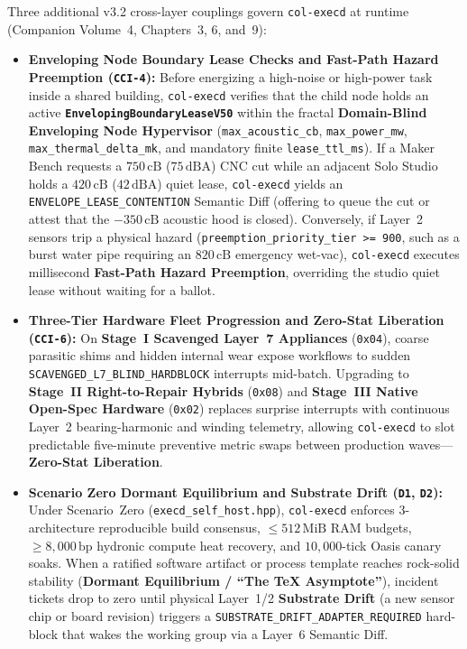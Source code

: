 Three additional v3.2 cross-layer couplings govern \texttt{col-execd} at runtime (Companion Volume~4, Chapters~3, 6, and~9):
\begin{itemize}
  \item \textbf{Enveloping Node Boundary Lease Checks and Fast-Path Hazard Preemption (\texttt{CCI-4}):} Before energizing a high-noise or high-power task inside a shared building, \texttt{col-execd} verifies that the child node holds an active \textbf{\texttt{EnvelopingBoundaryLeaseV50}} within the fractal \textbf{Domain-Blind Enveloping Node Hypervisor} (\texttt{max\_acoustic\_cb}, \texttt{max\_power\_mw}, \texttt{max\_thermal\_delta\_mk}, and mandatory finite \texttt{lease\_ttl\_ms}). If a Maker Bench requests a $750\,\mathrm{cB}$ ($75\,\mathrm{dBA}$) CNC cut while an adjacent Solo Studio holds a $420\,\mathrm{cB}$ ($42\,\mathrm{dBA}$) quiet lease, \texttt{col-execd} yields an \texttt{ENVELOPE\_LEASE\_CONTENTION} Semantic Diff (offering to queue the cut or attest that the $-350\,\mathrm{cB}$ acoustic hood is closed). Conversely, if Layer~2 sensors trip a physical hazard (\texttt{preemption\_priority\_tier >= 900}, such as a burst water pipe requiring an $820\,\mathrm{cB}$ emergency wet-vac), \texttt{col-execd} executes millisecond \textbf{Fast-Path Hazard Preemption}, overriding the studio quiet lease without waiting for a ballot.
  \item \textbf{Three-Tier Hardware Fleet Progression and Zero-Stat Liberation (\texttt{CCI-6}):} On \textbf{Stage~I Scavenged Layer~7 Appliances} (\texttt{0x04}), coarse parasitic shims and hidden internal wear expose workflows to sudden \texttt{SCAVENGED\_L7\_BLIND\_HARDBLOCK} interrupts mid-batch. Upgrading to \textbf{Stage~II Right-to-Repair Hybrids} (\texttt{0x08}) and \textbf{Stage~III Native Open-Spec Hardware} (\texttt{0x02}) replaces surprise interrupts with continuous Layer~2 bearing-harmonic and winding telemetry, allowing \texttt{col-execd} to slot predictable five-minute preventive metric swaps between production waves---\textbf{Zero-Stat Liberation}.
  \item \textbf{Scenario Zero Dormant Equilibrium and Substrate Drift (\texttt{D1}, \texttt{D2}):} Under Scenario~Zero (\texttt{execd\_self\_host.hpp}), \texttt{col-execd} enforces 3-architecture reproducible build consensus, $\le 512\,\mathrm{MiB}$ RAM budgets, $\ge 8{,}000\,\mathrm{bp}$ hydronic compute heat recovery, and $10{,}000$-tick Oasis canary soaks. When a ratified software artifact or process template reaches rock-solid stability (\textbf{Dormant Equilibrium / ``The \TeX{} Asymptote''}), incident tickets drop to zero until physical Layer~1/2 \textbf{Substrate Drift} (a new sensor chip or board revision) triggers a \texttt{SUBSTRATE\_DRIFT\_ADAPTER\_REQUIRED} hard-block that wakes the working group via a Layer~6 Semantic Diff.
\end{itemize}

